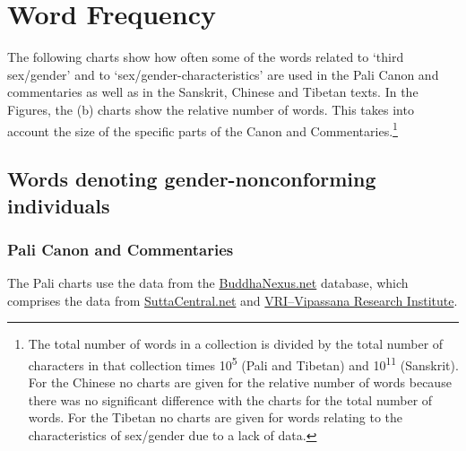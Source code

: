 \section{Word Frequency}
\label{appendix2}

The following charts show how often some of the words related to `third sex/gender' and to `sex/gender-characteristics' are used in the Pali Canon and commentaries as well as in the Sanskrit, Chinese and Tibetan texts. In the Figures, the (b) charts show the relative number of words. This takes into account the size of the specific parts of the Canon and Commentaries.\footnote{The total number of words in a collection is divided by the total number of characters in that collection times 10\textsuperscript{5} (Pali and Tibetan) and 10\textsuperscript{11} (Sanskrit). For the Chinese no charts are given for the relative number of words because there was no significant difference with the charts for the total number of words. For the Tibetan no charts are given for words relating to the characteristics of sex/gender due to a lack of data.}

\captionsetup{justification   = raggedright,
              singlelinecheck = false}

\subsection{Words denoting gender-nonconforming individuals}
\label{appendix2a}
\subsubsection*{Pali Canon and Commentaries}

The Pali charts use the data from the \href{https://buddhanexus.net}{BuddhaNexus.net} database, which comprises the data from \href{https://suttacentral.net/}{SuttaCentral.net} and \href{https://tipitaka.org/}{VRI--Vipassana Research Institute}.

